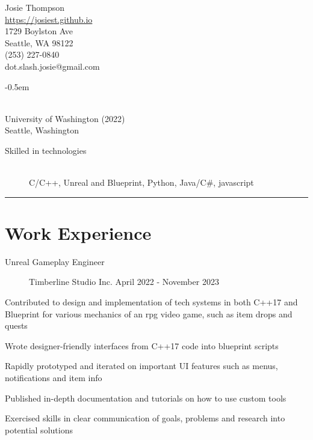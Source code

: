 \documentclass[10pt]{article}
\newenvironment{itemize*}
{\begin{itemize}[leftmargin=*]
    \setlength{\parskip}{0.5pt}}
{\end{itemize}}
\begin{document}
\begin{paracol}{2}
\noindent
\parbox[t]{0.5\textwidth}{
    {\sffamily\Huge Josie Thompson}\medskip\\
    \url{https://josiest.github.io}\\
    1729 Boylston Ave\\
    Seattle, WA 98122\\
    (253) 227-0840\\
    dot.slash.josie@gmail.com
}
\switchcolumn

\begin{description}
\itemsep -0.5em
\item[B.S. in Computer Science] \hfill \\
    University of Washington (2022)\\
    Seattle, Washington
\end{description}

\begin{description}
\item[Skilled in technologies] \hfill \\
C/C++, Unreal and Blueprint, Python, Java/C\#, javascript
\end{description}

\end{paracol}
\vspace{12pt}
\hrule

\section*{Work Experience}

\begin{description}
\item[Unreal Gameplay Engineer] Timberline Studio Inc.
    \hfill April 2022 - November 2023
\end{description}
\begin{itemize*}
\item Contributed to design and implementation of tech systems in both C++17 and
      Blueprint for various mechanics of an rpg video game, such as item drops
      and quests
\item Wrote designer-friendly interfaces from C++17 code into blueprint scripts
\item Rapidly prototyped and iterated on important UI features such as menus,
      notifications and item info
\item Published in-depth documentation and tutorials on how to use custom tools
\item Exercised skills in clear communication of goals, problems and research
      into potential solutions
\end{itemize*}
\vspace{10pt}
\end{document}
